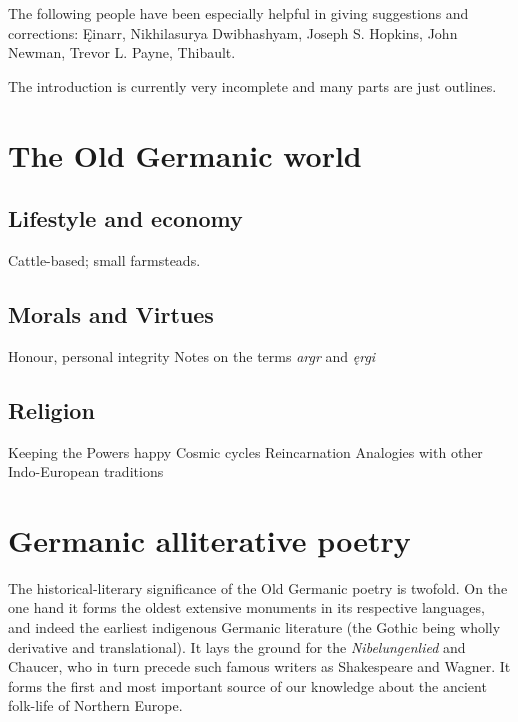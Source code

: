 \vfill

\newpage\thispagestyle{empty}

The following people have been especially helpful in giving suggestions and corrections: Ęinarr, Nikhilasurya Dwibhashyam, Joseph S. Hopkins, John Newman, Trevor L. Payne, Thibault.

\newpage\thispagestyle{empty}

\tableofcontents

\newpage\thispagestyle{empty}

\newpage


\printbibliography%


The introduction is currently very incomplete and many parts are just outlines.

\section{The Old Germanic world}

  \subsection{Lifestyle and economy}
    Cattle-based; small farmsteads.
  \subsection{Morals and Virtues}
    Honour, personal integrity
    Notes on the terms \emph{argr} and \emph{ęrgi}
  \subsection{Religion}
    Keeping the Powers happy
    Cosmic cycles
    Reincarnation
    Analogies with other Indo-European traditions


\section{Germanic alliterative poetry}

  The historical-literary significance of the Old Germanic poetry is twofold. On the one hand it forms the oldest extensive monuments in its respective languages, and indeed the earliest indigenous Germanic literature (the Gothic being wholly derivative and translational).  It lays the ground for the \emph{Nibelungenlied} and Chaucer, who in turn precede such famous writers as Shakespeare and Wagner.  It forms the first and most important source of our knowledge about the ancient folk-life of Northern Europe.

